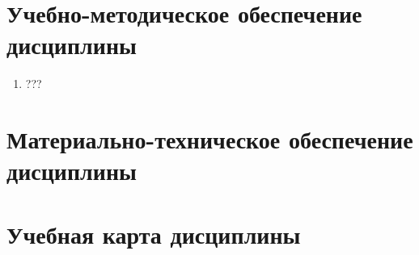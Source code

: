 \section{Учебно-методическое обеспечение дисциплины}


\begin{enumerate}%
	\item ???
\end{enumerate}




\section{Материально-техническое обеспечение дисциплины}
	



\section{Учебная карта дисциплины}



